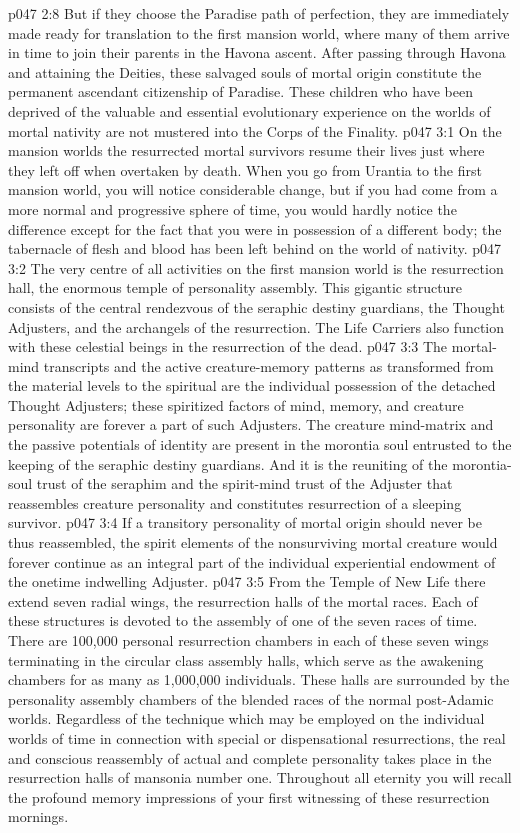 \vs p047 2:8 But if they choose the Paradise path of perfection, they are immediately made ready for translation to the first mansion world, where many of them arrive in time to join their parents in the Havona ascent. After passing through Havona and attaining the Deities, these salvaged souls of mortal origin constitute the permanent ascendant citizenship of Paradise. These children who have been deprived of the valuable and essential evolutionary experience on the worlds of mortal nativity are not mustered into the Corps of the Finality.
\vs p047 3:1 On the mansion worlds the resurrected mortal survivors resume their lives just where they left off when overtaken by death. When you go from Urantia to the first mansion world, you will notice considerable change, but if you had come from a more normal and progressive sphere of time, you would hardly notice the difference except for the fact that you were in possession of a different body; the tabernacle of flesh and blood has been left behind on the world of nativity.
\vs p047 3:2 The very centre of all activities on the first mansion world is the resurrection hall, the enormous temple of personality assembly. This gigantic structure consists of the central rendezvous of the seraphic destiny guardians, the Thought Adjusters, and the archangels of the resurrection. The Life Carriers also function with these celestial beings in the resurrection of the dead.
\vs p047 3:3 The mortal\hyp{}mind transcripts and the active creature\hyp{}memory patterns as transformed from the material levels to the spiritual are the individual possession of the detached Thought Adjusters; these spiritized factors of mind, memory, and creature personality are forever a part of such Adjusters. The creature mind\hyp{}matrix and the passive potentials of identity are present in the morontia soul entrusted to the keeping of the seraphic destiny guardians. And it is the reuniting of the morontia\hyp{}soul trust of the seraphim and the spirit\hyp{}mind trust of the Adjuster that reassembles creature personality and constitutes resurrection of a sleeping survivor.
\vs p047 3:4 If a transitory personality of mortal origin should never be thus reassembled, the spirit elements of the nonsurviving mortal creature would forever continue as an integral part of the individual experiential endowment of the onetime indwelling Adjuster.
\vs p047 3:5 From the Temple of New Life there extend seven radial wings, the resurrection halls of the mortal races. Each of these structures is devoted to the assembly of one of the seven races of time. There are 100,000 personal resurrection chambers in each of these seven wings terminating in the circular class assembly halls, which serve as the awakening chambers for as many as 1,000,000 individuals. These halls are surrounded by the personality assembly chambers of the blended races of the normal post\hyp{}Adamic worlds. Regardless of the technique which may be employed on the individual worlds of time in connection with special or dispensational resurrections, the real and conscious reassembly of actual and complete personality takes place in the resurrection halls of mansonia number one. Throughout all eternity you will recall the profound memory impressions of your first witnessing of these resurrection mornings.
